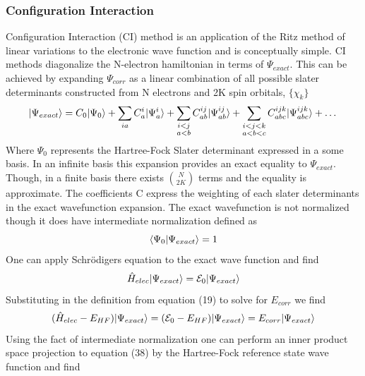 
    \subsubsection{Configuration Interaction}

      Configuration Interaction (CI) method is an application of the Ritz method of linear variations to the electronic wave function and is conceptually simple.\cite{Shavitt 1977, Ritz 1909, Szabo 1998} CI methods diagonalize the N-electron hamiltonian in terms of $\Psi_{exact}$.  This can be achieved by expanding $\Psi_{corr}$ as a linear combination of all possible slater determinants constructed from N electrons and 2K spin orbitals, $\{\chi_k\}$ 
        \begin{equation}
      	  | \Psi_{exact} \rangle = C_0| \Psi_0 \rangle + \sum_{ia} C^i_a | \Psi^i_a \rangle + \sum_{\substack{i<j\\  a<b}} C^{ij}_{ab} | \Psi^{ij}_{ab} \rangle + \sum_{\substack{i<j<k \\ a<b<c}} C_{abc}^{ijk} | \Psi_{abc}^{ijk} \rangle + \dots 
        \end{equation}
      Where  $\Psi_0$ represents the Hartree-Fock Slater determinant expressed in a some basis. In an infinite basis this expansion provides an exact equality to $\Psi_{exact}$.  Though, in a finite basis there exists $\binom{N}{2K}$\cite{Szabo 1998} terms and the equality is approximate.   The coefficients C express the weighting of each slater determinants in the exact wavefunction expansion.  The exact wavefunction is not normalized though it does have intermediate normalization\cite{Szabo 1998} defined as 
        \begin{equation}
        \langle\Psi_0|\Psi_{exact}\rangle = 1
        \end{equation}
      One can apply Schr{\"o}digers equation to the exact wave function and find 
        \begin{equation}
       	 \hat{H}_{elec}| \Psi_{exact} \rangle = \mathcal{E}_0 | \Psi_{exact} \rangle
        \end{equation}
      Substituting in the definition from equation (19) to solve for $E_{corr}$ we find 
        \begin{equation}
        	(\hat{H}_{elec} - E_{HF})| \Psi_{exact} \rangle = (\mathcal{E}_0 - E_{HF})| \Psi_{exact} \rangle = E_{corr} | \Psi_{exact} \rangle
        \end{equation}
      Using the fact of intermediate normalization one can perform an inner product space projection to equation (38) by the Hartree-Fock reference state wave function and find 
